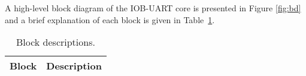 
A high-level block diagram of the IOB-UART core is presented in
Figure \ref{fig:bd} and a brief explanation of each block is given in
Table~\ref{tab:blocks}.



\begin{table}[H]
  \centering
    \begin{tabularx}{\textwidth}{ | c | X | }
    \hline
    \rowcolor{iob-green}
    {\bf Block} & {\bf Description} \\ \hline
    
    

    \end{tabularx}
  \caption{Block descriptions.}
  \label{tab:blocks}
\end{table}
